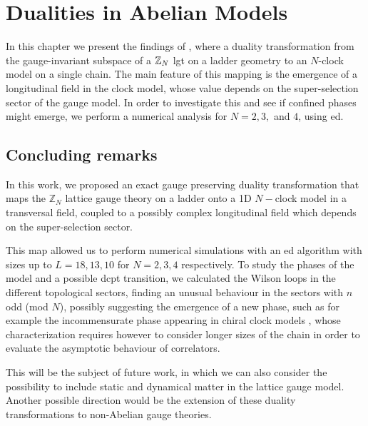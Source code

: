 \chapter{Dualities in Abelian Models}
\label{chap:dualities_in_abelian_models}

In this chapter we present the findings of \cite{pradhan2022ladder}, where a duality transformation from the gauge-invariant subspace of a $\mathbb{Z}_N$ \ac{lgt} on a ladder geometry to an $N$-clock model on a single chain.
The main feature of this mapping is the emergence of a longitudinal field in the clock model, whose value depends on the super-selection sector of the gauge model.
In order to investigate this and see if confined phases might emerge, we perform a numerical analysis for $N = 2, 3,$ and $4$, using \acl{ed}.















\section{Concluding remarks}
\label{sec:concluding_remarks}

In this work, we proposed an exact gauge preserving duality transformation that maps the  $\mathbb{Z}_N$ lattice gauge theory on a ladder onto a 1D $N-$clock model in a transversal field, coupled to a possibly complex longitudinal field which depends on the super-selection sector.

This map allowed us to perform numerical simulations with an \ac{ed} algorithm with sizes up to $L=18, 13, 10$ for $N=2,3,4$ respectively.
To study the phases of the model and a possible \ac{dcpt} transition, we calculated the Wilson loops in the different topological sectors, finding an unusual behaviour in the sectors with $n$ odd (mod $N$), possibly suggesting the emergence of a new phase, such as for example the incommensurate phase appearing in chiral clock models \cite{huse1983chiral, whitsitt2018clock, zhuang2015clock}, whose characterization requires however to consider longer sizes of the chain in order to evaluate the asymptotic behaviour of correlators.

This will be the subject of future work, in which we can also consider the possibility to include static and dynamical matter in the lattice gauge model.
Another possible direction would be the extension of these duality transformations to non-Abelian gauge theories.
